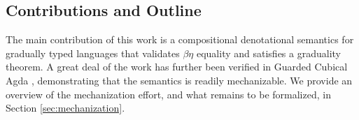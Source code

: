 


\subsection{Contributions and Outline}

The main contribution of this work is a compositional denotational
semantics for gradually typed languages that validates $\beta\eta$
equality and satisfies a graduality theorem. A great deal of the work
has further been verified in Guarded Cubical Agda \cite{veltri-vezzosi2020}, 
demonstrating that the semantics is readily mechanizable.
We provide an overview of the mechanization effort, and what remains to be formalized,
in Section \ref{sec:mechanization}.

\begin{comment}
\begin{enumerate}
\item First, we give a simple concrete term semantics where we show
  how to model the dynamic type as a solution to a guarded domain equation.
\item Next, we identify where prior work on classical domain theoretic
  semantics of gradual typing breaks down when using guarded semantics
  of recursive types.
\item We develop a key new concept of \emph{syntactic perturbations},
  which allow us to recover enough extensional reasoning to model the
  graduality property compositionally.
\item We combine this insight together with an abstract categorical
  model of gradual typing using reflexive graph categories and
  call-by-push-value to give a compositional construction of our
  denotational model.
\item We prove that the resulting denotational model provides a
  well-behaved semantics as defined above by proving \emph{adequacy},
  respect for an equational theory and the graduality property.
\end{enumerate}
\end{comment}

